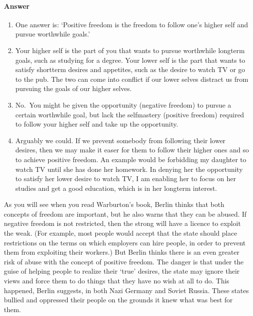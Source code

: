 \documentclass[letterpaper,10pt,english]{sphinxmanual}
\begin{document}
\paragraph{Answer}
\label{\detokenize{content/session_00/Part_00_02:id3}}\begin{enumerate}
%
\item {} 
One answer is: ‘Positive freedom is the freedom to follow one’s higher self and pursue worthwhile goals.’

\item {} 
Your higher self is the part of you that wants to pursue worthwhile long\sphinxhyphen{}term goals, such as studying for a degree. Your lower self is the part that wants to satisfy short\sphinxhyphen{}term desires and appetites, such as the desire to watch TV or go to the pub. The two can come into conflict if our lower selves distract us from pursuing the goals of our higher selves.

\item {} 
No. You might be given the opportunity (negative freedom) to pursue a certain worthwhile goal, but lack the self\sphinxhyphen{}mastery (positive freedom) required to follow your higher self and take up the opportunity.

\item {} 
Arguably we could. If we prevent somebody from following their lower desires, then we may make it easer for them to follow their higher ones and so to achieve positive freedom. An example would be forbidding my daughter to watch TV until she has done her homework. In denying her the opportunity to satisfy her lower desire to watch TV, I am enabling her to focus on her studies and get a good education, which is in her long\sphinxhyphen{}term interest.

\end{enumerate}

As you will see when you read Warburton’s book, Berlin thinks that both concepts of freedom are important, but he also warns that they can be abused. If negative freedom is not restricted, then the strong will have a licence to exploit the weak. (For example, most people would accept that the state should place restrictions on the terms on which employers can hire people, in order to prevent them from exploiting their workers.) But Berlin thinks there is an even greater risk of abuse with the
concept of positive freedom. The danger is that under the guise of helping people to realize their ‘true’ desires, the state may ignore their views and force them to do things that they have no wish at all to do. This happened, Berlin suggests, in both Nazi Germany and Soviet Russia. These states bullied and oppressed their people on the grounds it knew what was best for them.
\end{document}
